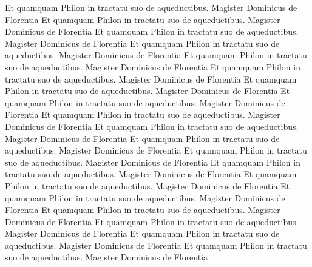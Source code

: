\documentclass{book}
\begin{document}
\begin{pairs}
\begin{Leftside}
Et quamquam Philon in tractatu suo de aqueductibus. Magister Dominicus de Florentia
Et quamquam Philon in tractatu suo de aqueductibus. Magister Dominicus de Florentia
Et quamquam Philon in tractatu suo de aqueductibus. Magister Dominicus de Florentia
Et quamquam Philon in tractatu suo de aqueductibus. Magister Dominicus de Florentia
Et quamquam Philon in tractatu suo de aqueductibus. Magister Dominicus de Florentia
Et quamquam Philon in tractatu suo de aqueductibus. Magister Dominicus de Florentia
Et quamquam Philon in tractatu suo de aqueductibus. Magister Dominicus de Florentia
Et quamquam Philon in tractatu suo de aqueductibus. Magister Dominicus de Florentia
Et quamquam Philon in tractatu suo de aqueductibus. Magister Dominicus de Florentia
Et quamquam Philon in tractatu suo de aqueductibus. Magister Dominicus de Florentia
Et quamquam Philon in tractatu suo de aqueductibus. Magister Dominicus de Florentia
Et quamquam Philon in tractatu suo de aqueductibus. Magister Dominicus de Florentia
Et quamquam Philon in tractatu suo de aqueductibus. Magister Dominicus de Florentia
Et quamquam Philon in tractatu suo de aqueductibus. Magister Dominicus de Florentia
Et quamquam Philon in tractatu suo de aqueductibus. Magister Dominicus de Florentia
Et quamquam Philon in tractatu suo de aqueductibus. Magister Dominicus de Florentia
Et quamquam Philon in tractatu suo de aqueductibus. Magister Dominicus de Florentia
Et quamquam Philon in tractatu suo de aqueductibus. Magister Dominicus de Florentia
Et quamquam Philon in tractatu suo de aqueductibus. Magister Dominicus de Florentia
\pend
\endnumbering
\end{Leftside}


\end{pairs}
\end{document}
